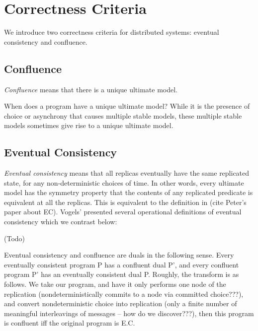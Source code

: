 \section{Correctness Criteria}

We introduce two correctness criteria for distributed systems: eventual consistency and confluence.

\subsection{Confluence}

{\em Confluence} means that there is a unique ultimate model.

When does a \lang program have a unique ultimate model?  While it is the presence of choice or asynchrony that causes multiple stable models, these multiple stable models sometimes give rise to a unique ultimate model.


\subsection{Eventual Consistency}

{\em Eventual consistency} means that all replicas eventually have the same replicated state, for any non-deterministic choices of time.  In other words, every ultimate model has the symmetry property that the contents of any replicated predicate is equivalent at all the replicas.  This is equivalent to the definition in (cite Peter's paper about EC).  Vogels' presented several operational definitions of eventual consistency which we contrast below:

(Todo)

Eventual consistency and confluence are duals in the following sense.  Every eventually consistent program P has a confluent dual P', and every confluent program P' has an eventually consistent dual P.  Roughly, the transform is as follows.  We take our program, and have it only performs one node of the replication (nondeterministically commits to a node via committed choice???), and convert nondeterministic choice into replication (only a finite number of meaningful interleavings of messages -- how do we discover???), then this program is confluent iff the original program is E.C.


